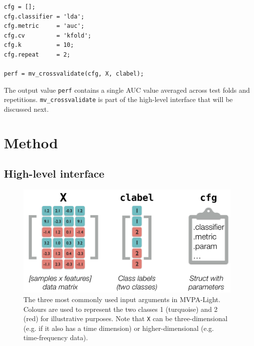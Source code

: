 \documentclass[utf8]{frontiersSCNS} %
\newcommand{\mvpa}{MVPA-Light}
\newcommand{\ttt}[1]{\texttt{#1}}
\begin{document}
\begin{verbatim}
cfg = [];
cfg.classifier = 'lda';
cfg.metric     = 'auc';
cfg.cv         = 'kfold';
cfg.k          = 10;
cfg.repeat     = 2;

perf = mv_crossvalidate(cfg, X, clabel);
\end{verbatim}

The output value \ttt{perf} contains a single AUC value averaged across test folds and repetitions. \ttt{mv\_crossvalidate} is part of the high-level interface that will be discussed next.

\section{Method}

\subsection{High-level interface}

\begin{figure}
\centering\includegraphics[width=.6\linewidth]{X_clabel_cfg}
\caption{The three most commonly used input arguments in \mvpa. Colours are used to represent the two classes 1 (turquoise) and 2 (red) for illustrative purposes. Note that \ttt{X} can be  three-dimensional (e.g. if it also has a time dimension) or higher-dimensional (e.g. time-frequency data).}
\label{fig:X}
\end{figure}
\end{document}
